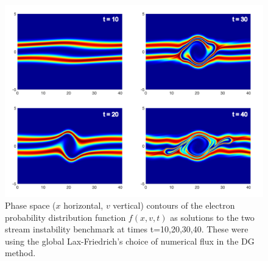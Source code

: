 \begin{figure}
    \centering
    \includegraphics[width=\textwidth]{fp16_fk6d/figures/two-stream-01.png}
    \caption{Phase space ($x$ horizontal, $v$ vertical) contours of the electron probability distribution function $f\left(x,v,t\right)$ as solutions to the two stream instability benchmark at times t=10,20,30,40. These were using the global Lax-Friedrich's choice of numerical flux in the DG method.}
    \label{fig:my_label}
\end{figure}

% 